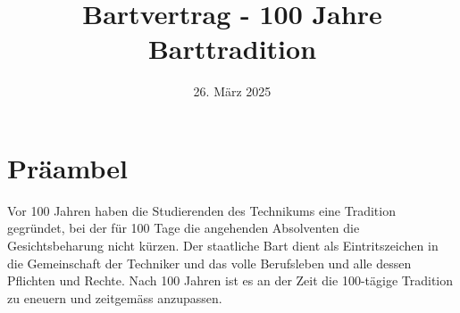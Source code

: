 \documentclass[fontsize=12pt,parskip=half]{scrartcl}
\begin{document}
\title{Bartvertrag - 100 Jahre Barttradition}
\date{26. März 2025}
\maketitle


\section*{Präambel}
Vor 100 Jahren haben die Studierenden des Technikums eine Tradition gegründet, bei der für 100 Tage die angehenden Absolventen die Gesichtsbeharung nicht kürzen.
Der staatliche Bart dient als Eintritszeichen in die Gemeinschaft der Techniker und das volle Berufsleben und alle dessen Pflichten und Rechte.
Nach 100 Jahren ist es an der Zeit die 100-tägige Tradition zu eneuern und zeitgemäss anzupassen.
\end{document}
